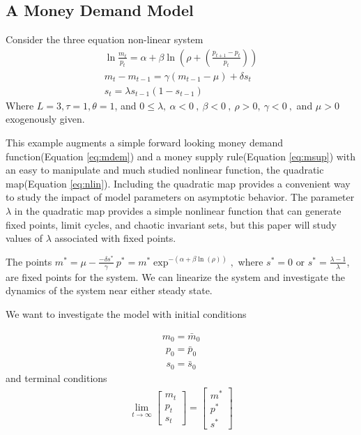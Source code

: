 \documentclass[12pt]{article}
\begin{document}
\subsection{A Money Demand Model}
          Consider the three equation non-linear system
\begin{gather}
          \ln \frac{m_t}{p_t} = \alpha  + \beta  \ln(\rho+ (\frac{p_{t+1}-p_t}{p_t})) \label{eq:mdem}\\
          m_{t}  - m_{t-1}    = \gamma (m_{t-1}    - \mu)+ \delta s_t\label{eq:msup}\\
s_t=\lambda s_{t-1}(1- s_{t-1})\label{eq:nlin}
\end{gather}
Where $L=3,\tau=1,\theta=1$, and $0 \leq \lambda, ~\alpha  < 0~,~\beta< 0~,~\rho> 0,~\gamma <0~,$ and  $\mu > 0  $ exogenously  given. 

This example augments a simple forward looking money demand function(Equation \ref{eq:mdem}) and
a money supply rule(Equation \ref{eq:msup}) with an easy to manipulate and much
studied  nonlinear function, the quadratic map(Equation \ref{eq:nlin}).
Including the quadratic map
 provides a convenient way to study the impact of model parameters on
asymptotic behavior.
The parameter $\lambda$ in the 
quadratic map provides  a simple nonlinear function that can generate
fixed points, limit cycles, and chaotic invariant sets, but
this paper will study values of $\lambda$ associated with fixed points.


The points $m^\ast=\mu-\frac{- \delta s^\ast}{\gamma}~
p^\ast=m^\ast\exp^{-(\alpha+\beta\ln(\rho))},$  where 
$ s^\ast = 0\text{ or }s^\ast=\frac{\lambda-1}{\lambda}$, are
fixed points for the system.
We can linearize the system and
 investigate the dynamics of the system near either steady state.

 We want to investigate
the model with 
initial conditions

\begin{gather*}
          m_0   = \bar{m}_0
\end{gather*}
\begin{gather*}
          p_0   = \bar{p}_0
\end{gather*}
\begin{gather*}
          s_0   = \bar{s}_0
\end{gather*}
and terminal conditions
\begin{gather*}
          \lim_{t\rightarrow\infty}
\left [\begin{array}{c}m_t\\ p_t\\ s_t \end{array} \right ]=
\left [\begin{array}{c}m^\ast\\ p^\ast\\ s^\ast \end{array} \right ]
\end{gather*}
\end{document}
